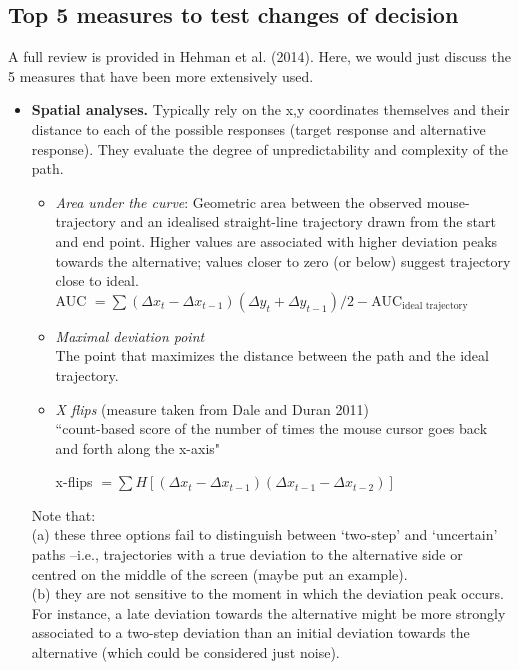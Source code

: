 \documentclass{article}
\newcommand{\addMM}[1]{{\leavevmode\color{red}#1}}
\begin{document}
\subsection{Top 5 measures to test changes of decision}
A full review is provided in Hehman et al. (2014). Here, we would just discuss the 5 measures that have been more extensively used. 

\begin{itemize}


\item \textbf{Spatial analyses.} Typically rely on the x,y coordinates themselves and their distance to each of the possible responses (target response and alternative response). They evaluate the degree of unpredictability and complexity of the path. 

\begin{itemize}
\item \textit{Area under the curve}: Geometric area between the observed mouse-trajectory and an idealised straight-line trajectory drawn from the start and end point. Higher values are associated with higher deviation peaks towards the alternative; values closer to zero (or below) suggest trajectory close to ideal. \\ 
AUC \(= \sum (\Delta x_{t} - \Delta x_{t-1})(\Delta y_{t} + \Delta y_{t-1})/2  - \text{AUC}_{\text{ideal trajectory}} \)





\item \textit{Maximal deviation point}
\\ The point that maximizes the distance between the path and the ideal trajectory.  

\item \textit{X flips} (measure taken from Dale and Duran 2011)
\\``count-based score of the number of times the mouse cursor goes back and forth along the x-axis"

x-flips  \(= \sum H[(\Delta x_{t} - \Delta x_{t-1})(\Delta x_{t-1} - \Delta x_{t-2})] \)

\end{itemize}
Note that: 
\\ (a) these three options fail to distinguish between `two-step' and `uncertain' paths --i.e., trajectories with a true deviation to the alternative side or centred on the middle of the screen (\addMM{maybe put an example}). \\
(b) they are not sensitive to the moment in which the deviation peak occurs. For instance, a late deviation towards the alternative might be more strongly associated to a two-step deviation than an initial deviation towards the alternative (which could be considered just noise).


\end{itemize}
\end{document}
